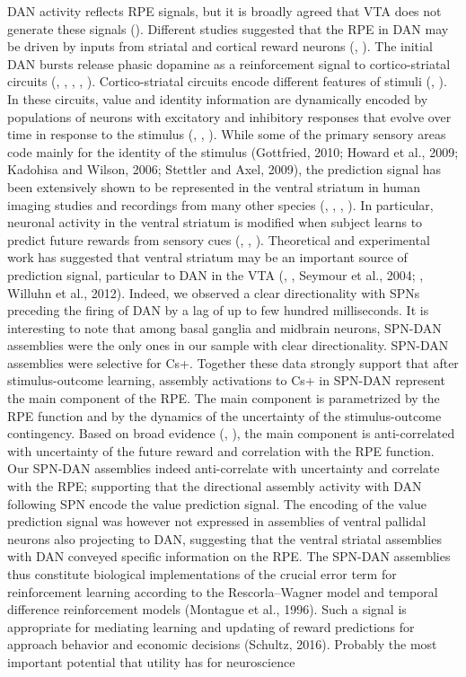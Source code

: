 DAN activity reflects RPE signals, but it is broadly agreed that VTA does not generate these signals (\cite{Schultz2016}). Different studies suggested that the RPE in DAN may be driven by inputs from striatal and cortical reward neurons (\cite{Cai1}, \cite{PadoaSchioppa}). The initial DAN bursts release phasic dopamine as a reinforcement signal to cortico-striatal circuits (\cite{Redgrave}, \cite{Schultz2002}, \cite{Ungless2004b}, \cite{Wise2004}, \cite{WatabeUchida}). Cortico-striatal circuits encode different features of stimuli (\cite{Rolls}, \cite{Yeshurun}). In these circuits, value and identity information are dynamically encoded by populations of neurons with excitatory and inhibitory responses that evolve over time in response to the stimulus (\cite{Averbeck}, \cite{Bakhurin}, \cite{Laurent}). While some of the primary sensory areas code mainly for the identity of the stimulus (Gottfried, 2010; Howard et al., 2009; Kadohisa and Wilson, 2006; Stettler and Axel, 2009), the prediction signal has been extensively shown to be represented in the ventral striatum in human imaging studies and recordings from many other species (\cite{Schultz2000}, \cite{Pagnoni}, \cite{Berridge2003}, \cite{ODoherty2004} ). In particular, neuronal activity in the ventral striatum is modified when subject learns to predict future rewards from sensory cues (\cite{Schultz2000}, \cite{Pagnoni}, \cite{Radua} ). Theoretical and experimental work has suggested that ventral striatum may be an important source of prediction signal, particular to DAN in the VTA (\cite{Daw2005}, \cite{ODoherty2004}, Seymour et al., 2004; \cite{Takahashi2016}, Willuhn et al., 2012). Indeed, we observed a clear directionality with SPNs preceding the firing of DAN by a lag of up to few hundred milliseconds. It is interesting to note that among basal ganglia and midbrain neurons, SPN-DAN assemblies were the only ones in our sample with clear directionality. SPN-DAN assemblies were selective for Cs+. Together these data strongly support that after stimulus-outcome learning, assembly activations to Cs+ in SPN-DAN represent the main component of the RPE. The main component is parametrized by the RPE function and by the dynamics of the uncertainty of the stimulus-outcome contingency. Based on broad evidence (\cite{Fiorillo}, \cite{Schultz2016}), the main component is anti-correlated with uncertainty of the future reward and correlation with the RPE function. Our SPN-DAN assemblies indeed anti-correlate with uncertainty and correlate with the RPE; supporting that the directional assembly activity with DAN following SPN encode the value prediction signal. The encoding of the value prediction signal was however not expressed in assemblies of ventral pallidal neurons also projecting to DAN, suggesting that the ventral striatal assemblies with DAN conveyed specific information on the RPE. The SPN-DAN assemblies thus constitute biological implementations of the crucial error term for reinforcement learning according to the Rescorla–Wagner model and temporal difference reinforcement models (Montague et al., 1996). Such a signal is appropriate for mediating learning and updating of reward predictions for approach behavior and economic decisions (Schultz, 2016). Probably the most important potential that utility has for neuroscience 